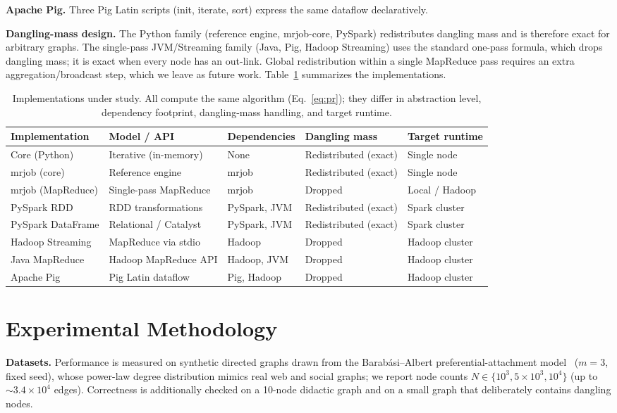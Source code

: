 \textbf{Apache Pig.} Three Pig Latin scripts (init, iterate, sort) express the
same dataflow declaratively.

\textbf{Dangling-mass design.} The Python family (reference engine, mrjob-core,
PySpark) redistributes dangling mass and is therefore exact for arbitrary
graphs. The single-pass JVM/Streaming family (Java, Pig, Hadoop Streaming) uses
the standard one-pass formula, which drops dangling mass; it is exact when every
node has an out-link. Global redistribution within a single MapReduce pass
requires an extra aggregation/broadcast step, which we leave as future work.
Table~\ref{tab:impl} summarizes the implementations.

\begin{table}[t]
\centering
\caption{Implementations under study. All compute the same algorithm
(Eq.~\eqref{eq:pr}); they differ in abstraction level, dependency footprint,
dangling-mass handling, and target runtime.}
\label{tab:impl}
\begin{tabular}{@{}lllll@{}}
\toprule
Implementation & Model / API & Dependencies & Dangling mass & Target runtime \\
\midrule
Core (Python)      & Iterative (in-memory)        & None              & Redistributed (exact) & Single node \\
mrjob (core)       & Reference engine             & mrjob             & Redistributed (exact) & Single node \\
mrjob (MapReduce)  & Single-pass MapReduce        & mrjob             & Dropped               & Local / Hadoop \\
PySpark RDD        & RDD transformations          & PySpark, JVM      & Redistributed (exact) & Spark cluster \\
PySpark DataFrame  & Relational / Catalyst        & PySpark, JVM      & Redistributed (exact) & Spark cluster \\
Hadoop Streaming   & MapReduce via stdio          & Hadoop            & Dropped               & Hadoop cluster \\
Java MapReduce     & Hadoop MapReduce API         & Hadoop, JVM       & Dropped               & Hadoop cluster \\
Apache Pig         & Pig Latin dataflow           & Pig, Hadoop       & Dropped               & Hadoop cluster \\
\bottomrule
\end{tabular}
\end{table}

\section{Experimental Methodology}
\label{sec:method}
\textbf{Datasets.} Performance is measured on synthetic directed graphs drawn
from the Barab\'asi--Albert preferential-attachment model~\cite{barabasi1999}
($m=3$, fixed seed), whose power-law degree distribution mimics real web and
social graphs; we report node counts $N\in\{10^3,5\!\times\!10^3,10^4\}$ (up to
$\sim\!3.4\times10^4$ edges). Correctness is additionally checked on a 10-node
didactic graph and on a small graph that deliberately contains dangling nodes.

